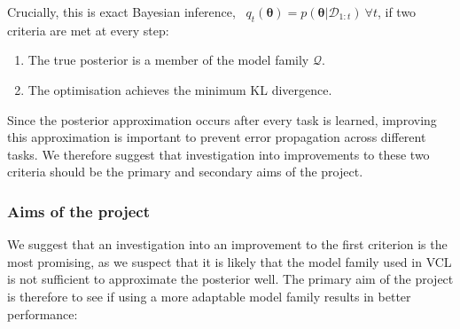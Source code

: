 \documentclass[a4paper,11=0pt]{article}
\let\boldtheta\theta %
\renewcommand{\theta}{\boldsymbol{\boldtheta}} %
\begin{document}
Crucially, this is exact Bayesian inference, \ $q_t(\theta)=p(\theta | \mathcal{D}_{1:t}) \: \forall t$, if two criteria are met at every step:

\begin{enumerate}
\item The true posterior is a member of the model family $\mathcal{Q}$.
\item The optimisation achieves the minimum KL divergence.
\end{enumerate}

Since the posterior approximation occurs after every task is learned, improving this approximation is important to prevent error propagation across different tasks. We therefore suggest that investigation into improvements to these two criteria should be the primary and secondary aims of the project.

\vspace{-1em}
\subsubsection*{Aims of the project}

\vspace{-1em}

We suggest that an investigation into an improvement to the first criterion is the most promising, as we suspect that it is likely that the model family used in VCL is not sufficient to approximate the posterior well. The primary aim of the project is therefore to see if using a more adaptable model family results in better performance:
\end{document}
